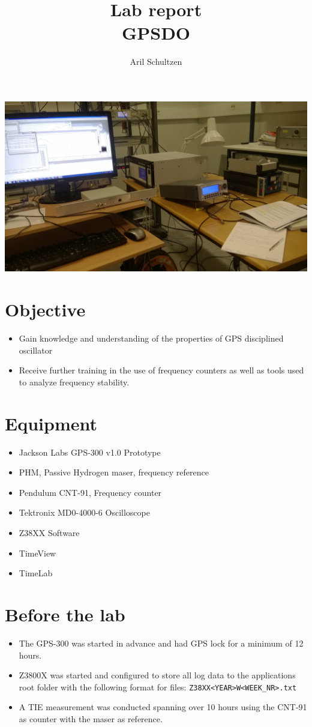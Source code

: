 \documentclass[11pt,english,a4paper]{article}
\title{Lab report \\ GPSDO}
\author{Aril Schultzen}
\begin{document}
\maketitle
\includegraphics[width=1 \textwidth]{lab.jpg}
\section{Objective}
\begin{itemize}
\item Gain knowledge and understanding of the properties of GPS disciplined oscillator
\item Receive further training in the use of frequency counters as well as tools used to analyze frequency stability.
\end{itemize}

\section{Equipment}
\begin{itemize}
  \item Jackson Labs GPS-300 v1.0 Prototype
  \item PHM, Passive Hydrogen maser, frequency reference
  \item Pendulum CNT-91, Frequency counter
  \item Tektronix MD0-4000-6 Oscilloscope
  \item Z38XX Software
  \item TimeView
  \item TimeLab
\end{itemize}

\section{Before the lab}
\begin{itemize}
  \item The GPS-300 was started in advance and had GPS lock for a minimum of 12 hours.
  \item Z3800X was started and configured to store all log data to the applications root folder with the following format for files: \newline \texttt{Z38XX<YEAR>W<WEEK\_NR>.txt}
  \item A TIE measurement was conducted spanning over 10 hours using the CNT-91 as counter with the maser as reference.
\end{itemize}
\end{document}
